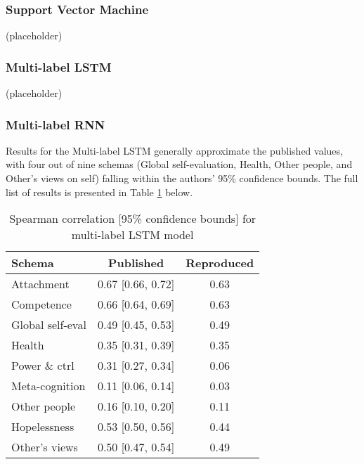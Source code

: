 \documentclass[11pt,a4paper]{article}
\begin{document}
\subsubsection{Support Vector Machine}

(placeholder)

\subsubsection{Multi-label LSTM}

(placeholder)

\subsubsection{Multi-label RNN}
\label{section:multi_rnn}
Results for the Multi-label LSTM generally approximate the published values, with four out of nine schemas (Global self-evaluation, Health, Other people, and Other's views on self) falling within the authors' 95\% confidence bounds. The full list of results is presented in Table \ref{tab:multi_lstm} below. 

\begin{table}[H]
\centering
\begin{tabular}{lcc}
\toprule
Schema                  &Published          &Reproduced \\ %
\midrule
Attachment              & 0.67 [0.66, 0.72] & 0.63 \\
Competence              & 0.66 [0.64, 0.69] & 0.63 \\
Global self-eval        & 0.49 [0.45, 0.53] & 0.49 \\
Health                  & 0.35 [0.31, 0.39] & 0.35 \\
Power \& ctrl           & 0.31 [0.27, 0.34] & 0.06 \\
Meta-cognition          & 0.11 [0.06, 0.14] & 0.03 \\
Other people            & 0.16 [0.10, 0.20] & 0.11 \\
Hopelessness            & 0.53 [0.50, 0.56] & 0.44 \\
Other's views           & 0.50 [0.47, 0.54] & 0.49 \\
\bottomrule
\end{tabular}
\caption{Spearman correlation [95\% confidence bounds] for multi-label LSTM model}
\label{tab:multi_lstm}
\end{table}
\end{document}
